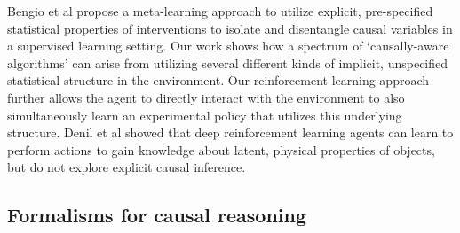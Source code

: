 
Bengio et al \citep{bengio2019meta} propose a meta-learning approach to utilize explicit, pre-specified statistical properties of interventions to isolate and disentangle causal variables in a supervised learning setting. Our work shows how a spectrum of `causally-aware algorithms' can arise from utilizing several different kinds of implicit, unspecified statistical structure in the environment. Our reinforcement learning approach further allows the agent to directly interact with the environment to also simultaneously learn an experimental policy that utilizes this underlying structure. Denil et al \citep{denil2016learning} showed that deep reinforcement learning agents can learn to perform actions to gain knowledge about latent, physical properties of objects, but do not explore explicit causal inference.

\subsection{Formalisms for causal reasoning}


